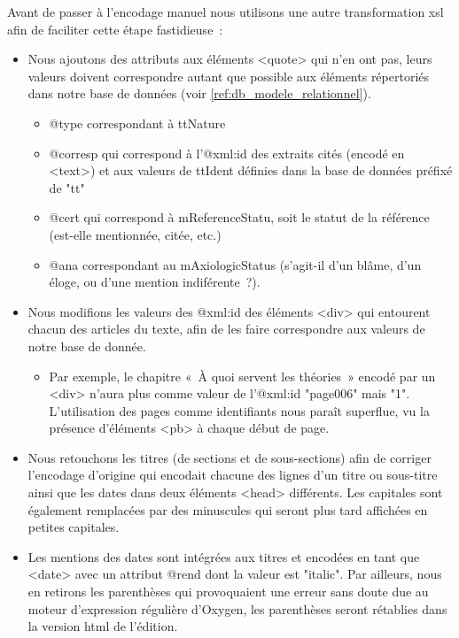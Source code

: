 \documentclass[12pt, a4paper]{article}
\begin{document}
Avant de passer à l'encodage manuel nous utilisons une autre transformation xsl afin de faciliter cette étape fastidieuse~:
\begin{itemize}
    \item Nous ajoutons des attributs aux éléments <quote> qui n'en ont pas, leurs valeurs doivent correspondre autant que possible aux éléments répertoriés dans notre base de données (voir \ref{ref:db_modele_relationnel}).
    \begin{itemize}
        \item @type correspondant à ttNature
        \item @corresp qui correspond à l'@xml\NoAutoSpaceBeforeFDP:id des extraits cités (encodé en <text>) et aux valeurs de ttIdent définies dans la base de données préfixé de "tt"
        \item @cert qui correspond à mReferenceStatu, soit le statut de la référence (est-elle mentionnée, citée, etc.)
        \item @ana correspondant au mAxiologicStatus (s'agit-il d'un blâme, d'un éloge, ou d'une mention indiférente~?).
    \end{itemize}
    \item Nous modifions les valeurs des @xml\NoAutoSpaceBeforeFDP:id des éléments <div> qui entourent chacun des articles du texte, afin de les faire correspondre aux valeurs de notre base de donnée.
        \begin{itemize}
            \item Par exemple, le chapitre «~À quoi servent les théories~» encodé par un <div> n'aura plus comme valeur de l'@xml\NoAutoSpaceBeforeFDP:id "page006" mais "1". L'utilisation des pages comme identifiants nous paraît superflue, vu la présence d'éléments <pb> à chaque début de page.
        \end{itemize}
    \item Nous retouchons les titres (de sections et de sous-sections) afin de corriger l'encodage d'origine qui encodait chacune des lignes d'un titre ou sous-titre ainsi que les dates dans deux éléments <head> différents. Les capitales sont également remplacées par des minuscules qui seront plus tard affichées en petites capitales.
    \item Les mentions des dates sont intégrées aux titres et encodées en tant que <date> avec un attribut @rend dont la valeur est "italic". Par ailleurs, nous en retirons les parenthèses qui provoquaient une erreur sans doute due au moteur d'expression régulière d'Oxygen, les parenthèses seront rétablies dans la version html de l'édition.

\end{itemize}
\end{document}

